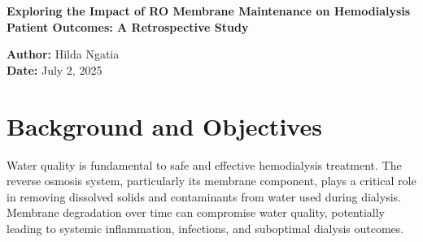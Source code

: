 \documentclass[11pt,a4paper]{article}
\begin{document}
\begin{titlepage}
    \centering
    \vspace*{3cm}
    {\LARGE\bfseries Exploring the Impact of RO Membrane Maintenance on Hemodialysis Patient Outcomes: A Retrospective Study \par}
    
    \vfill  %

    \centering
        \textbf{Author:} Hilda Ngatia \\
        \textbf{Date:} July 2, 2025
  
\end{titlepage}



\tableofcontents
\newpage

\begin{abstract}
This retrospective observational study examined the relationship between reverse osmosis (RO) membrane maintenance frequency and clinical outcomes in hemodialysis patients across 34 healthcare facilities over a 16-month period (January 2024 to April 2025). The analysis of 544 patient-months of data revealed significant associations between membrane maintenance practices and key clinical indicators, providing evidence-based insights for dialysis unit quality improvement protocols.

\textbf{Key Findings:}
\begin{itemize}
    \item More frequent RO membrane changes were significantly associated with reduced infection rates, hospital admissions, and mortality
    \item Each additional membrane change was associated with a 5.1\% reduction in infection risk and 10.4\% reduction in mortality risk
    \item Older membrane age correlated with poorer clinical outcomes across all measured parameters
    \item Water quality parameters (TDS and conductivity) showed significant relationships with patient outcomes
\end{itemize}
\end{abstract}



\section{Background and Objectives}

Water quality is fundamental to safe and effective hemodialysis treatment. The reverse osmosis system, particularly its membrane component, plays a critical role in removing dissolved solids and contaminants from water used during dialysis. Membrane degradation over time can compromise water quality, potentially leading to systemic inflammation, infections, and suboptimal dialysis outcomes.
\end{document}

